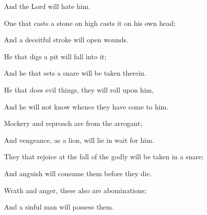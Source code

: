 {\par }{\Q And the Lord will hate him.
\par }{\BB \par }{\Q {}One that casts a stone on high casts it on his own head;
\par }{\Q And a deceitful stroke will open wounds.
\par }{\Q {}He that digs a pit will fall into it;
\par }{\Q And he that sets a snare will be taken therein.
\par }{\Q {}He that does evil things, they will roll upon him,
\par }{\Q And he will not know whence they have come to him.
\par }{\Q {}Mockery and reproach are from the arrogant;
\par }{\Q And vengeance, as a lion, will lie in wait for him.
\par }{\Q {}They that rejoice at the fall of the godly will be taken in a snare;
\par }{\Q And anguish will consume them before they die.
\par }{\BB \par }{\Q {}Wrath and anger, these also are abominations;
\par }{\Q And a sinful man will possess them.

}
